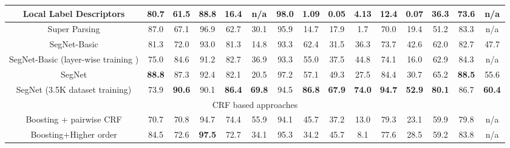 {\begin{landscape}
\begin{table}[th]
{{\begin{tabular}{c|c|c|c|c|c|c|c|c|c|c|c|ccc}
Local Label Descriptors  \citep{yang2012local}  & 80.7     & 61.5 & 88.8 & 16.4 & n/a         & 98.0 & 1.09       & 0.05  & 4.13        & 12.4     & 0.07      & 36.3       & 73.6    & n/a    \\ \hline

Super Parsing   \citep{tighe2013superparsing}           & 87.0     & 67.1 & 96.9 & 62.7 & 30.1        & 95.9 & 14.7       & 17.9  & 1.7         & 70.0     & 19.4      & 51.2       & 83.3    & n/a    \\ \hline
SegNet-Basic          &  81.3    & 72.0  & 93.0 & 81.3 & 14.8 & 93.3 & 62.4 & 31.5 & 36.3  & 73.7 & 42.6  &   62.0    & 82.7   &   47.7   \\ \hline
SegNet-Basic (layer-wise training \citep{SegNetarXiv})         & 75.0     & 84.6 & 91.2 & 82.7 & 36.9        & 93.3 & 55.0       & 37.5  & 44.8        & 74.1     & 16.0      & 62.9       & 84.3   & n/a     \\ \hline
SegNet    &  \textbf{88.8}   & 87.3 & 92.4  & 82.1 & 20.5 & 97.2 &  57.1 & 49.3  &  27.5       &  84.4   &  30.7     &   65.2    &  \textbf{88.5}  & 55.6     \\ \hline
SegNet (3.5K dataset training)   & 73.9  & \textbf{90.6}  & 90.1  & \textbf{86.4}  &  \textbf{69.8}  & 94.5 &   \textbf{86.8}   & \textbf{67.9}  &   \textbf{74.0}	   &  \textbf{94.7}	   &  \textbf{52.9}    & \textbf{80.1}  & 86.7 &       \textbf{60.4}\\ \hline

\multicolumn{15}{c}{CRF based approaches}                                                                                                       \\ \hline

Boosting + pairwise CRF  \citep{Sturgess} & 70.7     & 70.8 & 94.7 & 74.4 & 55.9        & 94.1 & 45.7       & 37.2  & 13.0        & 79.3     & 23.1      & 59.9       & 79.8  & n/a      \\ \hline

Boosting+Higher order \citep{Sturgess}    & 84.5     & 72.6 & \textbf{97.5} & 72.7 & 34.1        & 95.3 & 34.2       & 45.7  & 8.1         & 77.6     & 28.5      & 59.2       & 83.8    & n/a    \\ \hline


\end{tabular}}}
\end{table}
\end{landscape}}
